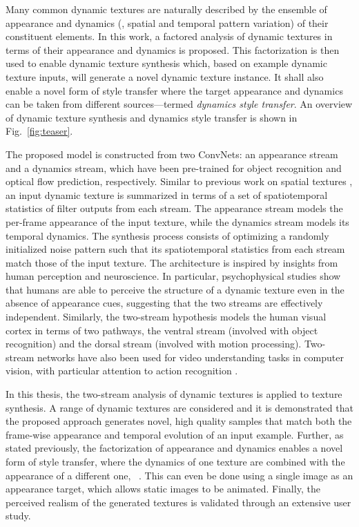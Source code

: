Many common dynamic textures are naturally described by the ensemble of 
appearance and dynamics (\ie, spatial and temporal pattern variation) of their 
constituent elements. In this work, a factored analysis of dynamic 
textures in terms of their appearance and dynamics is proposed.
This factorization is then used to enable dynamic texture synthesis
which, based on example dynamic texture inputs, will generate a novel dynamic
texture instance.
It shall also enable a novel form of style transfer where the 
target appearance and dynamics can be taken from different sources---termed \emph{dynamics style transfer}.
An overview of dynamic texture synthesis and dynamics style transfer
is shown in Fig.\ \ref{fig:teaser}.



The proposed model is constructed from two ConvNets: an appearance stream and a dynamics stream,
which have been pre-trained for object recognition
and optical flow prediction, respectively.
Similar to previous work on spatial textures
\cite{gatys2015,heeger1995pyramid,portilla2000parametric}, an input dynamic texture is summarized in terms of a set of
spatiotemporal statistics of filter outputs from each stream.
The appearance stream models the per-frame appearance of
the input texture, while the dynamics stream models its
temporal dynamics.
The synthesis process consists of optimizing a randomly initialized noise pattern such that its spatiotemporal statistics from
each stream match those of the input texture.
The architecture is inspired by insights from human perception and 
neuroscience.
In particular, psychophysical studies \cite{cutting1982} show that
humans are able to perceive the structure of a dynamic texture even
in the absence of appearance cues, suggesting that the two streams
are effectively independent.
Similarly, the two-stream hypothesis \cite{goodale1992} models the 
human visual cortex in terms of two pathways, the ventral stream
(involved with object recognition) and the
dorsal stream (involved with motion processing). Two-stream networks have also been used for video understanding tasks in computer vision, with particular attention to action recognition \cite{simonyan2014,feichtenhofer2016two}.

In this thesis, the two-stream analysis of
dynamic textures is applied to texture synthesis.
A range of dynamic textures are considered and it is demonstrated that the 
proposed approach generates novel, high quality samples that match
both the frame-wise appearance and temporal evolution of an input
example.
Further, as stated previously, the factorization of appearance and dynamics enables a 
novel form of style transfer, where the dynamics of one texture are 
combined with the appearance of a different one,
\cf\ \cite{gatys2016image}.
This can even be done using a single image as an appearance
target, which allows static images to be animated.
Finally, the perceived realism of the generated textures is validated
through an extensive user study.

